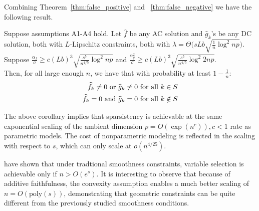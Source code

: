 Combining Theorem~\ref{thm:false_positive} and
~\ref{thm:false_negative} 
we have the following result.
\begin{corollary}
Suppose assumptions A1-A4 hold. Let $\hat{f}$ be any AC solution and $\hat{g}_k$'s be any DC solution, both with $L$-Lipschitz constraints, both with 
$\lambda = \Theta \Big( sLb \sqrt{\frac{1}{n} \log^2 np} \Big)$. \\


Suppose 
$\frac{\alpha_f}{\sigma} \geq c (Lb)^3 \sqrt{\frac{s^5}{n^{4/5}} \log^2 np}$ and $\frac{\alpha_g^2}{\sigma} \geq c (Lb)^3 \sqrt{\frac{s^5}{n^{4/5}} \log^2 2np}$.\\

Then, for all large enough $n$, we have that with probability at least $1-\frac{1}{n}$:
\begin{align*}
\widehat{f}_k \neq 0 \textrm{ or } \widehat{g}_k \neq 0 &\textrm{ for all } k \in S\\
\widehat{f}_k = 0 \textrm{ and } \widehat{g}_k = 0 & \textrm{ for all } k \notin S
\end{align*}



\end{corollary}
The above corollary implies that sparsistency is achievable at the same exponential scaling of the ambient dimension $p = O(\exp(n^c)), c<1$ rate as parametric models. The cost of nonparametric modeling is reflected in the scaling with respect to $s$, which can only scale at $o(n^{4/25})$.

\begin{remark}
\citet{dalalyan:12} have shown that under tradtional smoothness constraints, variable selection is achievable only if $n > O(e^s)$. It is interesting to observe that because of additive faithfulness, the convexity assumption enables a much better scaling of $n = O(\textrm{poly}(s))$, demonstrating that geometric constraints can be quite different from the previously studied smoothness conditions.
\end{remark}



 
